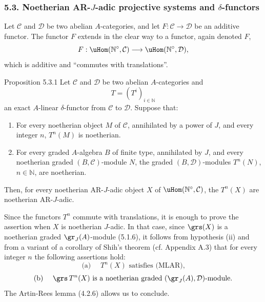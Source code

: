 \subsubsection*{5.3. Noetherian AR-\(J\)-adic projective systems and \(\delta\)-functors}

Let \(\mathcal C\) and \(\mathcal D\) be two abelian \(A\)-categories, and let \(F:\mathcal C\to\mathcal D\) be an additive functor. The functor \(F\) extends in the clear way to a functor, again denoted \(F\),
\[
F:\uHom(\mathbb N^\circ,\mathcal C)\longrightarrow\uHom(\mathbb N^\circ,\mathcal D),
\]
which is additive and “commutes with translations”.

\begin{statement}{Proposition 5.3.1}
Let \(\mathcal C\) and \(\mathcal D\) be two abelian \(A\)-categories and
\[
T=(T^i)_{i\in\mathbb N}
\]
an exact \(A\)-linear \(\delta\)-functor from \(\mathcal C\) to \(\mathcal D\). Suppose that:
\begin{enumerate}[label=\textup{(\roman*)}]
\item For every noetherian object \(M\) of \(\mathcal C\), annihilated by a power of \(J\), and every integer \(n\), \(T^n(M)\) is noetherian.
\item For every graded \(A\)-algebra \(B\) of finite type, annihilated by \(J\), and every noetherian graded \((B,\mathcal C)\)-module \(N\), the graded \((B,\mathcal D)\)-modules \(T^n(N)\), \(n\in\mathbb N\), are noetherian.
\end{enumerate}
Then, for every noetherian AR-\(J\)-adic object \(X\) of \(\uHom(\mathbb N^\circ,\mathcal C)\), the \(T^n(X)\) are noetherian AR-\(J\)-adic.
\end{statement}

\begin{prooftext}
Since the functors \(T^n\) commute with translations, it is enough to prove the assertion when \(X\) is noetherian \(J\)-adic. In that case, since \(\grs(X)\) is a noetherian graded \(\gr_J(A)\)-module (5.1.6), it follows from hypothesis (ii) and from a variant of a corollary of Shih's theorem (cf. Appendix A.3) that for every integer \(n\) the following assertions hold:
\[
\text{(a) }\quad T^n(X)\text{ satisfies (MLAR),}
\]
\[
\text{(b) }\quad \grs\,T^n(X)\text{ is a noetherian graded }(\gr_J(A),\mathcal D)\text{-module.}
\]
The Artin-Rees lemma (4.2.6) allows us to conclude.
\end{prooftext}

